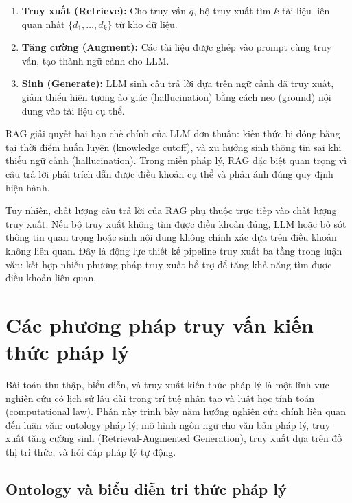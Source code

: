 \begin{enumerate}
  \item \textbf{Truy xuất (Retrieve):} Cho truy vấn $q$, bộ truy xuất tìm $k$ tài
        liệu liên quan nhất $\{d_1, \ldots, d_k\}$ từ kho dữ liệu.
  \item \textbf{Tăng cường (Augment):} Các tài liệu được ghép vào prompt cùng truy
        vấn, tạo thành ngữ cảnh cho LLM.
  \item \textbf{Sinh (Generate):} LLM sinh câu trả lời dựa trên ngữ cảnh đã truy
        xuất, giảm thiểu hiện tượng ảo giác (hallucination) bằng cách neo (ground)
        nội dung vào tài liệu cụ thể.
\end{enumerate}

RAG giải quyết hai hạn chế chính của LLM đơn thuần: kiến thức bị đóng băng tại thời
điểm huấn luyện (knowledge cutoff), và xu hướng sinh thông tin sai khi thiếu ngữ cảnh
(hallucination). Trong miền pháp lý, RAG đặc biệt quan trọng vì câu trả lời phải
trích dẫn được điều khoản cụ thể và phản ánh đúng quy định hiện hành.

Tuy nhiên, chất lượng câu trả lời của RAG phụ thuộc trực tiếp vào chất lượng truy
xuất. Nếu bộ truy xuất không tìm được điều khoản đúng, LLM hoặc bỏ sót thông tin
quan trọng hoặc sinh nội dung không chính xác dựa trên điều khoản không liên quan.
Đây là động lực thiết kế pipeline truy xuất ba tầng trong luận văn: kết hợp nhiều
phương pháp truy xuất bổ trợ để tăng khả năng tìm được điều khoản liên quan.

\section{Các phương pháp truy vấn kiến thức pháp lý}
\label{sec:cong-trinh-lien-quan}

Bài toán thu thập, biểu diễn, và truy xuất kiến thức pháp lý là một lĩnh vực nghiên
cứu có lịch sử lâu dài trong trí tuệ nhân tạo và luật học tính toán (computational
law). Phần này trình bày năm hướng nghiên cứu chính liên quan đến luận văn: ontology
pháp lý, mô hình ngôn ngữ cho văn bản pháp lý, truy xuất tăng cường sinh
(Retrieval-Augmented Generation), truy xuất dựa trên đồ thị tri thức, và hỏi đáp
pháp lý tự động.

\subsection{Ontology và biểu diễn tri thức pháp lý}
\label{subsec:ontology-phap-ly}

